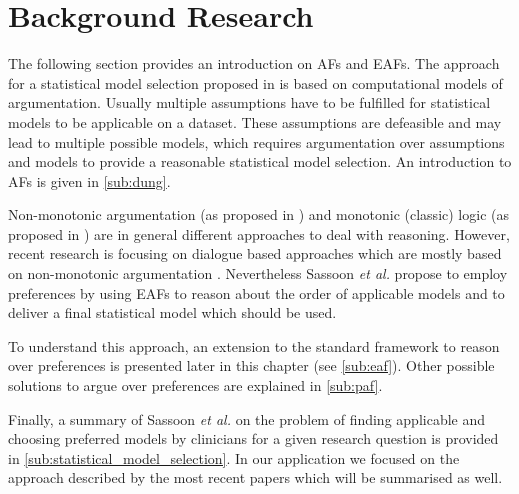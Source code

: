 \section{Background Research}
\label{sec:background}

The following section provides an introduction on \glspl{AF} and \glspl{EAF}. The approach for a statistical model selection proposed in \cite{sassoon2014} is based on computational models of argumentation. Usually multiple assumptions have to be fulfilled for statistical models to be applicable on a dataset. These assumptions are defeasible and may lead to multiple possible models, which requires argumentation over assumptions and models to provide a reasonable statistical model selection. An introduction to \glspl{AF} is given in \autoref{sub:dung}. 

Non-monotonic argumentation (as proposed in \cite{liao,dung1995}) and monotonic (classic) logic (as proposed in \cite{Reiter1980}) are in general different approaches to deal with reasoning. However, recent research is focusing on dialogue based approaches which are mostly based on non-monotonic argumentation \cite{parsons2000,Walton1995}. 
Nevertheless Sassoon \textit{et al.} propose to employ preferences by using \glspl{EAF} to reason about the order of applicable models and to deliver a final statistical model which should be used. 

To understand this approach, an extension to the standard framework to reason over preferences is presented later in this chapter (see \autoref{sub:eaf}). Other possible solutions to argue over preferences are explained in \autoref{sub:paf}.

Finally, a summary of Sassoon \textit{et al.} \cite{sassoon2014} on the problem of finding applicable and choosing preferred models by clinicians for a given research question is provided in \autoref{sub:statistical_model_selection}. In our application we focused on the approach described by the most recent papers \cite{sassoon2016,sassoon2016CD} which will be summarised as well.







% 
